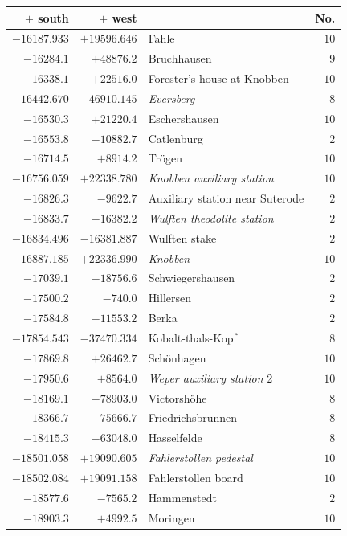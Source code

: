 \begin{center}\begingroup\fontsize{8}{9}\selectfont
\setlength{\tabcolsep}{4pt}
\begin{tabular}{r|r|p{170pt}|r}\hline
\(+\) south&\(+\) west&&No.\\\hline
\(-16187.933\)&\(+19596.646\)&Fahle&\(10\)\\
\(-16284.1\)&\(+48876.2\)&Bruchhausen&\(9\)\\
\(-16338.1\)&\(+22516.0\)&Forester’s house at Knobben&\(10\)\\
\(-16442.670\)&\(-46910.145\)&\textit{Eversberg}&\(8\)\\
\(-16530.3\)&\(+21220.4\)&Eschershausen&\(10\)\\
\(-16553.8\)&\(-10882.7\)&Catlenburg&\(2\)\\
\(-16714.5\)&\(+8914.2\)&Trögen&\(10\)\\
\(-16756.059\)&\(+22338.780\)&\textit{Knobben auxiliary station}&\(10\)\\
\(-16826.3\)&\(-9622.7\)&Auxiliary station near Suterode&\(2\)\\
\(-16833.7\)&\(-16382.2\)&\textit{Wulften theodolite station}&\(2\)\\
\(-16834.496\)&\(-16381.887\)&Wulften stake&\(2\)\\
\(-16887.185\)&\(+22336.990\)&\textit{Knobben}&\(10\)\\
\(-17039.1\)&\(-18756.6\)&Schwiegershausen&\(2\)\\
\(-17500.2\)&\(-740.0\)&Hillersen&\(2\)\\
\(-17584.8\)&\(-11553.2\)&Berka&\(2\)\\
\(-17854.543\)&\(-37470.334\)&Kobalt-thals-Kopf&\(8\)\\
\(-17869.8\)&\(+26462.7\)&Schönhagen&\(10\)\\
\(-17950.6\)&\(+8564.0\)&\textit{Weper auxiliary station} 2&\(10\)\\
\(-18169.1\)&\(-78903.0\)&Victorshöhe&\(8\)\\
\(-18366.7\)&\(-75666.7\)&Friedrichsbrunnen&\(8\)\\
\(-18415.3\)&\(-63048.0\)&Hasselfelde&\(8\)\\
\(-18501.058\)&\(+19090.605\)&\textit{Fahlerstollen pedestal}&\(10\)\\
\(-18502.084\)&\(+19091.158\)&Fahlerstollen board&\(10\)\\
\(-18577.6\)&\(-7565.2\)&Hammenstedt&\(2\)\\
\(-18903.3\)&\(+4992.5\)&Moringen&\(10\)\\

\end{tabular}
\end{center}
